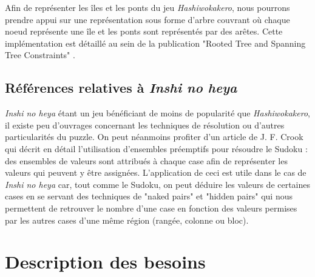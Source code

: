 \documentclass[12pt]{article}
\begin{document}
Afin de représenter les îles et les ponts du jeu \textit{Hashiwokakero}, nous pourrons prendre appui sur une représentation sous forme d'arbre couvrant où chaque noeud représente une île et les ponts sont représentés par des arêtes. Cette implémentation est détaillé au sein de la publication "Rooted Tree and Spanning Tree Constraints" \cite{prosser2006rooted}.

\subsection{Références relatives à \textit{Inshi no heya}}
\textit{Inshi no heya} étant un jeu bénéficiant de moins de popularité que \textit{Hashiwokakero}, il existe peu d'ouvrages concernant les techniques de résolution ou d'autres particularités du puzzle. On peut néanmoins profiter d'un article de J. F. Crook \cite{crook2009pencil} qui décrit en détail l'utilisation d'ensembles préemptifs pour résoudre le Sudoku : des ensembles de valeurs sont attribués à chaque case afin de représenter les valeurs qui peuvent y être assignées. L'application de ceci est utile dans le cas de \textit{Inshi no heya} car, tout comme le Sudoku, on peut déduire les valeurs de certaines cases en se servant des techniques de "naked pairs" et "hidden pairs" qui nous permettent de retrouver le nombre d'une case en fonction des valeurs permises par les autres cases d'une même région (rangée, colonne ou bloc).

\newpage
\section{Description des besoins}
\end{document}
